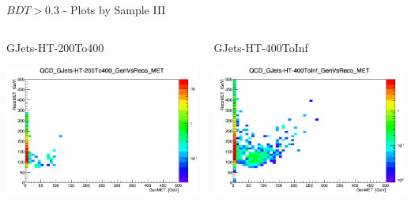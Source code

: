 \documentclass[8pt]{beamer}
\begin{document}
\begin{frame}{$BDT>0.3$ - Plots by Sample III}

\begin{columns}

\begin{block}{GJets-HT-200To400}
 
\centering
\includegraphics[width=\linewidth]{img/QCD_GJets-HT-200To400_GenVsReco_MET.png} 
 
\end{block}

\begin{block}{GJets-HT-400ToInf}
 
\centering
\includegraphics[width=\linewidth]{img/QCD_GJets-HT-400ToInf_GenVsReco_MET.png} 
 
\end{block}

\end{columns} 
 
\end{frame}
\end{document}
